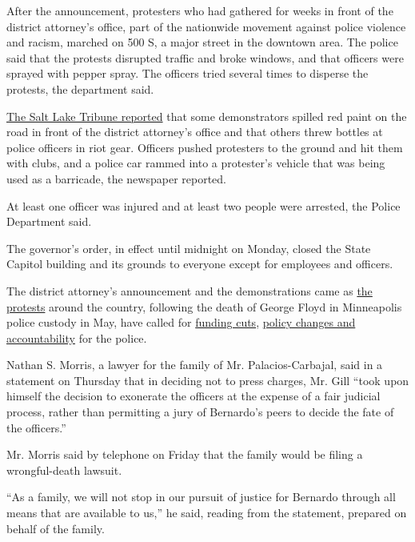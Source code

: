After the announcement, protesters who had gathered for weeks in front
of the district attorney's office, part of the nationwide movement
against police violence and racism, marched on 500 S, a major street in
the downtown area. The police said that the protests disrupted traffic
and broke windows, and that officers were sprayed with pepper spray. The
officers tried several times to disperse the protests, the department
said.

\href{https://www.sltrib.com/news/2020/07/09/protesters-angry-bernardo/}{The
Salt Lake Tribune reported} that some demonstrators spilled red paint on
the road in front of the district attorney's office and that others
threw bottles at police officers in riot gear. Officers pushed
protesters to the ground and hit them with clubs, and a police car
rammed into a protester's vehicle that was being used as a barricade,
the newspaper reported.

At least one officer was injured and at least two people were arrested,
the Police Department said.

The governor's order, in effect until midnight on Monday, closed the
State Capitol building and its grounds to everyone except for employees
and officers.

The district attorney's announcement and the demonstrations came as
\href{https://www.nytimes3xbfgragh.onion/interactive/2020/07/03/us/george-floyd-protests-crowd-size.html?searchResultPosition=12}{the
protests} around the country, following the death of George Floyd in
Minneapolis police custody in May, have called for
\href{https://www.nytimes3xbfgragh.onion/2020/06/08/us/what-does-defund-police-mean.html}{funding
cuts},
\href{https://www.nytimes3xbfgragh.onion/2020/06/05/nyregion/police-records-50a.html}{policy
changes and accountability} for the police.

Nathan S. Morris, a lawyer for the family of Mr. Palacios-Carbajal, said
in a statement on Thursday that in deciding not to press charges, Mr.
Gill ``took upon himself the decision to exonerate the officers at the
expense of a fair judicial process, rather than permitting a jury of
Bernardo's peers to decide the fate of the officers.''

Mr. Morris said by telephone on Friday that the family would be filing a
wrongful-death lawsuit.

``As a family, we will not stop in our pursuit of justice for Bernardo
through all means that are available to us,'' he said, reading from the
statement, prepared on behalf of the family.

